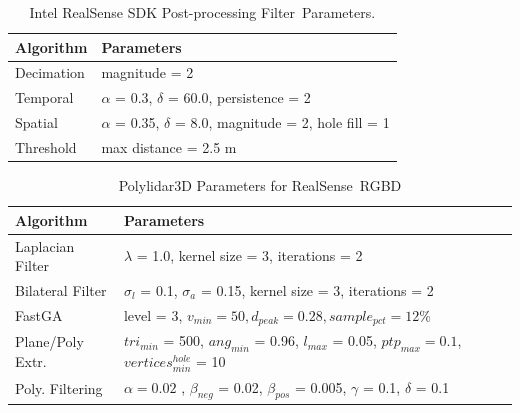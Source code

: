 \begin{table}[H]
\centering
\caption{Intel RealSense SDK Post-processing Filter~Parameters.}\label{table:realsense_parameters}
\begin{tabular}{@{}ll@{}}
\toprule
\textbf{Algorithm}        & \textbf{Parameters}                                                          \\ \midrule
Decimation     & magnitude = 2   \\
Temporal      & $\alpha$ = 0.3, $\delta$ = 60.0, persistence = 2 \\
Spatial       & $\alpha$ = 0.35, $\delta$ = 8.0, magnitude = 2, hole fill = 1  \\
Threshold     & max distance = 2.5 m  \\ \bottomrule
\end{tabular}
\end{table}
\unskip

\begin{table}[H]
\centering
\caption{Polylidar3D Parameters for RealSense~RGBD}\label{table:rgbd_parameters}
\begin{tabular}{@{}ll@{}}
\toprule
\textbf{Algorithm}        & \textbf{Parameters}                                                          \\ \midrule
Laplacian Filter & $\lambda$ = 1.0, kernel size = 3, iterations = 2   \\
Bilateral Filter & $\sigma_l$ = 0.1, $\sigma_a$ = 0.15, kernel size = 3, iterations = 2 \\
FastGA           & level = 3,  $v_{min} = 50, d_{peak} = 0.28, sample_{pct} = 12\%$            \\
Plane/Poly Extr.      & $tri_{min}$ = 500, $ang_{min}$ = 0.96, $l_{max}$ = 0.05, $ptp_{max} = 0.1$, $vertices^{hole}_{min}$ = 10  \\
Poly. Filtering      & $\alpha = 0.02$ , $\beta_{neg}$ = 0.02, $\beta_{pos}$ = 0.005, $\gamma$ = 0.1, $\delta$ = 0.1      \\ \bottomrule
\end{tabular}
\end{table}


